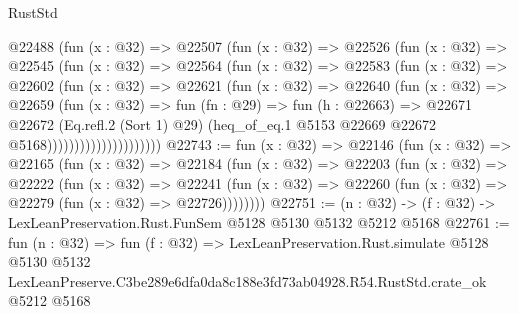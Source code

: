 \begin{lexlean}{RustStd}
\begin{coremodule}
                      @22488
                        (fun (x : @32) =>
                        @22507
                          (fun (x : @32) =>
                          @22526
                            (fun (x : @32) =>
                            @22545
                              (fun (x : @32) =>
                              @22564
                                (fun (x : @32) =>
                                @22583
                                  (fun (x : @32) =>
                                  @22602
                                    (fun (x : @32) =>
                                    @22621
                                      (fun (x : @32) =>
                                      @22640
                                        (fun (x : @32) =>
                                        @22659
                                          (fun (x : @32) =>
                                          fun (fn : @29) =>
                                          fun (h : @22663) =>
                                          @22671
                                            @22672
                                            (Eq.refl.{2} (Sort 1) @29)
                                            (heq_of_eq.{1}
                                              @5153
                                              @22669
                                              @22672
                                              @5168)))))))))))))))))))))
@22743 := fun (x : @32) =>
  @22146
    (fun (x : @32) =>
    @22165
      (fun (x : @32) =>
      @22184
        (fun (x : @32) =>
        @22203
          (fun (x : @32) =>
          @22222
            (fun (x : @32) =>
            @22241
              (fun (x : @32) => @22260 (fun (x : @32) => @22279 (fun (x : @32) => @22726))))))))
@22751 := (n : @32) -> (f : @32) -> LexLeanPreservation.Rust.FunSem @5128 @5130 @5132 @5212 @5168
@22761 := fun (n : @32) =>
  fun (f : @32) =>
  LexLeanPreservation.Rust.simulate
    @5128
    @5130
    @5132
    LexLeanPreserve.C3be289e6dfa0da8c188e3fd73ab04928.R54.RustStd.crate_ok
    @5212
    @5168
\end{coremodule}
\end{lexlean}

